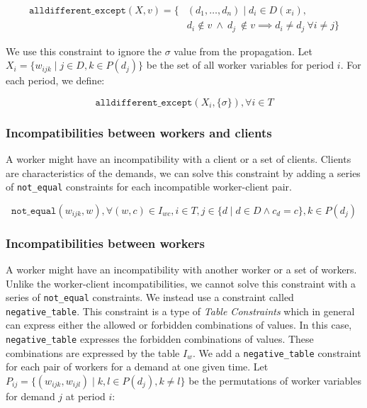 \documentclass[../../thesis.tex]{subfiles}
\begin{document}
\begin{align*}
   \texttt{alldifferent\_except} (X, v) = \{& (d_1, \dots, d_n) \mid d_i \in D(x_i), \\ 
   & d_i \notin v \ \land \ d_j \ \notin v \implies d_i \neq d_j \ \forall i \neq j \}
\end{align*}

We use this constraint to ignore the $\sigma$ value from the propagation. Let $X_i = \{w_{ijk} \mid j \in D, k \in P(d_j) \}$ be the set of all worker variables for period $i$. For each period, we define:

\begin{equation}
  \texttt{alldifferent\_except}(X_i, \{ \sigma \}), \forall i \in T
\end{equation}

\subsubsection{Incompatibilities between workers and clients}

A worker might have an incompatibility with a client or a set of clients. 
Clients are characteristics of the demands, we can solve this constraint by adding 
a series of \texttt{not\_equal} constraints for each incompatible worker-client pair.

\begin{equation}
  \texttt{not\_equal}(w_{ijk}, w), \forall (w, c) \in I_{wc}, i \in T, j \in \{ d \mid d \in D \land c_d = c \}, k \in P(d_j)
\end{equation}

\subsubsection{Incompatibilities between workers}

A worker might have an incompatibility with another worker or a set of workers. 
Unlike the worker-client incompatibilities, we cannot solve this constraint with a series of \texttt{not\_equal} constraints. We instead use a constraint 
called \texttt{negative\_table}. This constraint is a type of \emph{Table Constraints} \cite{Henteryck:Table} which in general can
express either the allowed or forbidden combinations of values. In this case, \texttt{negative\_table} expresses the forbidden combinations of values.
These combinations are expressed by the table $I_{w}$. 
We add a \texttt{negative\_table} constraint for each pair of workers for a demand at one given time. Let $P_{ij} = \{ (w_{ijk}, w_{ijl}) \mid k, l \in P(d_j), k \neq l \}$ 
be the permutations of worker variables for demand $j$ at period $i$:
\end{document}

